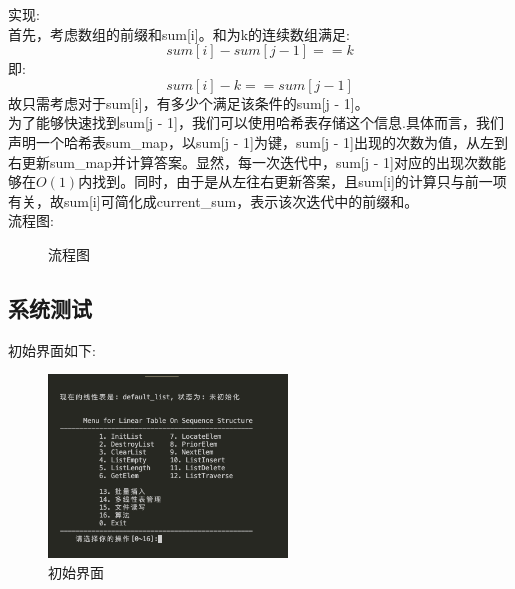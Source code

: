 \documentclass[supercite]{Experimental_Report}
\theoremstyle{definition}
\begin{document}
\noindent
实现: \\
首先，考虑数组的前缀和sum[i]。和为k的连续数组满足: $$sum[i] - sum[j - 1] == k$$
即: $$sum[i] - k == sum[j - 1]$$
故只需考虑对于sum[i]，有多少个满足该条件的sum[j - 1]。\\
为了能够快速找到sum[j - 1]，我们可以使用哈希表存储这个信息.具体而言，我们声明一个哈希表sum\_map，以sum[j - 1]为键，sum[j - 1]出现的次数为值，从左到右更新sum\_map并计算答案。显然，每一次迭代中，sum[j - 1]对应的出现次数能够在$O(1)$内找到。同时，由于是从左往右更新答案，且sum[i]的计算只与前一项有关，故sum[i]可简化成current\_sum，表示该次迭代中的前缀和。\\
\clearpage
\noindent
流程图:
\begin{figure}[htbp]
	\centering
	\centering
	\caption{流程图}
	\label{fig6-4}
\end{figure}

\newpage

\subsection{系统测试}

\noindent
初始界面如下:
\begin{figure}[htbp]
	\centering
	\includegraphics[width=2.5in]{sq_list/initial_interface.png}
	\caption{初始界面}
	\label{fig1-1}
\end{figure}
\end{document}
